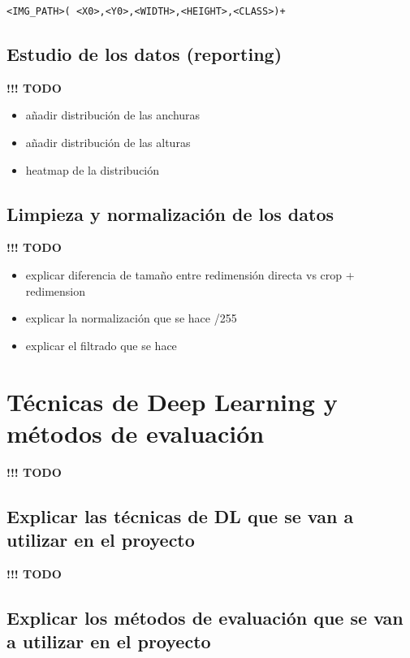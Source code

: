 \documentclass[]{article}
\begin{document}
\begin{lstlisting}[frame=single,basicstyle=\ttfamily\footnotesize]
<IMG_PATH>( <X0>,<Y0>,<WIDTH>,<HEIGHT>,<CLASS>)+
\end{lstlisting}

\subsection{Estudio de los datos (reporting)}

\textbf{!!! TODO}
\begin{itemize}
	\item añadir distribución de las anchuras
	\item añadir distribución de las alturas
	\item heatmap de la distribución
\end{itemize}

\subsection{Limpieza y normalización de los datos}

\textbf{!!! TODO}
\begin{itemize}
	\item explicar diferencia de tamaño entre redimensión directa vs crop + redimension
	\item explicar la normalización que se hace /255
	\item explicar el filtrado que se hace
\end{itemize}

\newpage
\section{Técnicas de Deep Learning y métodos de evaluación}


\textbf{!!! TODO}

\subsection{Explicar las técnicas de DL que se van a utilizar en el proyecto}


\textbf{!!! TODO}

\subsection{Explicar los métodos de evaluación que se van a utilizar en el proyecto}
\end{document}
